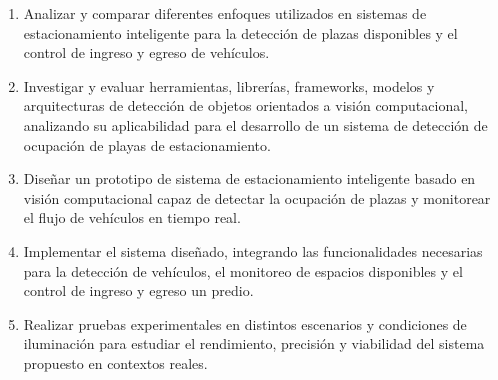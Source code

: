 \documentclass[12pt,a4paper]{article}
\begin{document}
\begin{enumerate}[O1.]
    
  \item Analizar y comparar diferentes enfoques utilizados en sistemas de estacionamiento inteligente para la detección de plazas disponibles y el control de ingreso y egreso de vehículos.

  
    
    \item Investigar y evaluar herramientas, librerías, frameworks, modelos y arquitecturas de detección de objetos orientados a visión computacional, analizando su aplicabilidad para el desarrollo de un sistema de detección de ocupación de playas de estacionamiento.
    
    \item Diseñar un prototipo de sistema de estacionamiento inteligente basado en visión computacional capaz de detectar la ocupación de plazas y monitorear el flujo de vehículos en tiempo real.
    

   \item Implementar el sistema diseñado, integrando las funcionalidades necesarias para la detección de vehículos, el monitoreo de espacios disponibles y el control de ingreso y egreso un predio.

   \item Realizar pruebas experimentales en distintos escenarios y condiciones de iluminación para estudiar el rendimiento, precisión y viabilidad del sistema propuesto en contextos reales. %


\end{enumerate}
\end{document}
